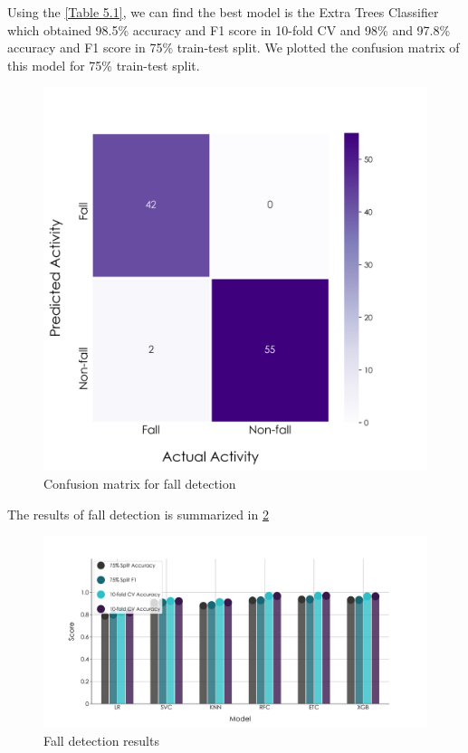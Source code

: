 Using the \ref{Table 5.1}, we can find the best model is the Extra Trees Classifier which obtained 98.5\% accuracy and F1 score in 10-fold CV and 98\% and 97.8\% accuracy and F1 score in 75\% train-test split. We plotted the confusion matrix of this model for 75\% train-test split.

\begin{figure}[H]
\centering
\includegraphics[width=1\textwidth]{./figure/chap 5/conf_binary.png}
\caption{Confusion matrix for fall detection}
\label{Fig 5.5}
\end{figure}

The results of fall detection is summarized in \ref{Fig 5.6}
\begin{figure}[H]
\centering
\includegraphics[width=1\textwidth]{./figure/chap 5/binary_model_scores.png}
\caption{Fall detection results}
\label{Fig 5.6}
\end{figure}

